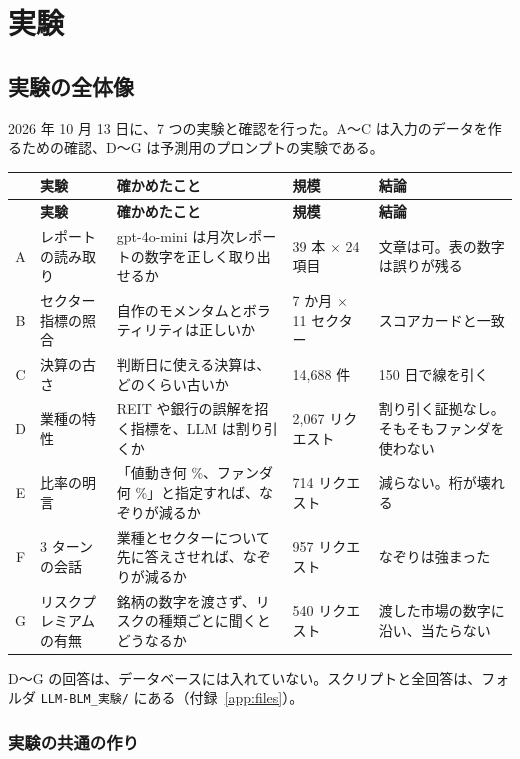 \documentclass[xelatex,ja=standard,jafont=hiragino-pron,a4paper,10pt]{bxjsreport}
\newcommand{\code}[1]{\texttt{#1}}
\begin{document}
\part{実験}

\chapter{実験の全体像}\label{ch:expall}

2026 年 10 月 13 日に、7 つの実験と確認を行った。A〜C は入力のデータを作るための確認、D〜G は予測用のプロンプトの実験である。

\begin{longtable}{cp{3.20cm}p{5.60cm}p{2.20cm}p{2.60cm}}
\toprule
 & \textbf{実験} & \textbf{確かめたこと} & \textbf{規模} & \textbf{結論} \\
\midrule
\endfirsthead
\toprule
 & \textbf{実験} & \textbf{確かめたこと} & \textbf{規模} & \textbf{結論} \\
\midrule
\endhead
\bottomrule
\endfoot
A & レポートの読み取り & gpt-4o-mini は月次レポートの数字を正しく取り出せるか & 39 本 $\times$ 24 項目 & 文章は可。表の数字は誤りが残る \\
B & セクター指標の照合 & 自作のモメンタムとボラティリティは正しいか & 7 か月 $\times$ 11 セクター & スコアカードと一致 \\
C & 決算の古さ & 判断日に使える決算は、どのくらい古いか & 14,688 件 & 150 日で線を引く \\
D & 業種の特性 & REIT や銀行の誤解を招く指標を、LLM は割り引くか & 2,067 リクエスト & 割り引く証拠なし。そもそもファンダを使わない \\
E & 比率の明言 & 「値動き何 \%、ファンダ何 \%」と指定すれば、なぞりが減るか & 714 リクエスト & 減らない。桁が壊れる \\
F & 3 ターンの会話 & 業種とセクターについて先に答えさせれば、なぞりが減るか & 957 リクエスト & なぞりは強まった \\
G & リスクプレミアムの有無 & 銘柄の数字を渡さず、リスクの種類ごとに聞くとどうなるか & 540 リクエスト & 渡した市場の数字に沿い、当たらない \\
\end{longtable}

D〜G の回答は、データベースには入れていない。スクリプトと全回答は、フォルダ \code{LLM-BLM\_実験/} にある（付録~\ref{app:files}）。

\section{実験の共通の作り}
\end{document}

